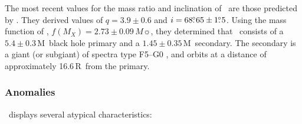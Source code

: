 \vspace{\myparskip}

The most recent values for the mass ratio and
inclination of \groj\ are those predicted by %
. They derived values of $q=3.9\pm0.6$ and $i=68 \hbox{$.\!\!^\circ$} 65 \pm
1 \hbox{$.\!\!^\circ$} 5$. Using the mass function of , %
$f(M_X) = 2.73\pm0.09\,M\sun$, they determined that
\groj\ consists of a $5.4\pm0.3$\,M\sun\ black hole primary and a
$1.45\pm0.35$\,M\sun\ secondary. The secondary is a giant (or subgiant) of spectra type F5--G0%
, and orbits at a distance of approximately 16.6\,R\sun\ from the primary. %


\subsubsection{Anomalies}\label{cha:GROJ1655-40:sec:IntroductionToJ1655:subsec:PropertiesOfJ1655:subsubsec:Eccentricities}

\groj\ displays several atypical characteristics:

